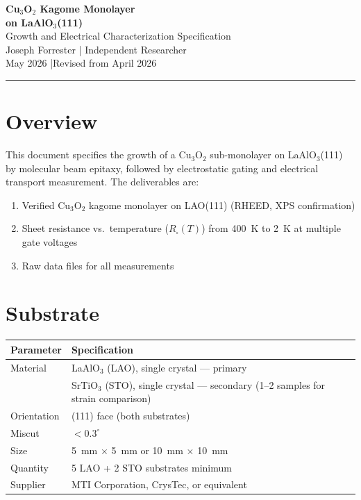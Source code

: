 \documentclass[11pt, a4paper]{article}
\begin{document}
\begin{center}
  {\LARGE \textbf{Cu$_3$O$_2$ Kagome Monolayer}}\\[4pt]
  {\LARGE \textbf{on LaAlO$_3$(111)}}\\[6pt]
  {\large Growth and Electrical Characterization Specification}\\[10pt]
  {\color{nm-gray}\small Joseph Forrester \quad|\quad
    Independent Researcher}\\[4pt]
  {\color{nm-gray}\small May 2026 \quad|\quad Revised from April 2026}
\end{center}

\vspace{1em}\hrule\vspace{1em}

\section*{Overview}

This document specifies the growth of a Cu$_3$O$_2$ sub-monolayer
on LaAlO$_3$(111) by molecular beam epitaxy, followed by
electrostatic gating and electrical transport measurement.
The deliverables are:

\begin{enumerate}[nosep]
  \item Verified Cu$_3$O$_2$ kagome monolayer on LAO(111)
        (RHEED, XPS confirmation)
  \item Sheet resistance vs.\ temperature ($R_\square(T)$)
        from 400~K to 2~K at multiple gate voltages
  \item Raw data files for all measurements
\end{enumerate}

\section{Substrate}

\begin{center}
\begin{tabular}{@{}lp{9cm}@{}}
\toprule
\textbf{Parameter} & \textbf{Specification} \\
\midrule
Material & LaAlO$_3$ (LAO), single crystal --- primary \\
 & SrTiO$_3$ (STO), single crystal --- secondary
  (1--2 samples for strain comparison) \\
Orientation & (111) face (both substrates) \\
Miscut & $< 0.3^\circ$ \\
Size & 5~mm $\times$ 5~mm or 10~mm $\times$ 10~mm \\
Quantity & 5 LAO + 2 STO substrates minimum \\
Supplier & MTI Corporation, CrysTec, or equivalent \\
\bottomrule
\end{tabular}
\end{center}
\end{document}
